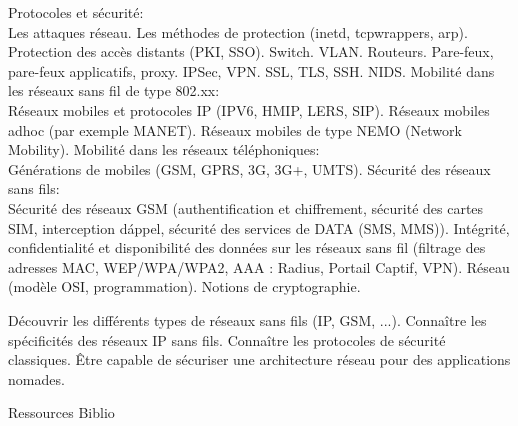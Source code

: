 \vfill

{
Protocoles et sécurité:\\
Les attaques réseau. Les méthodes de protection (inetd, tcpwrappers, arp).
Protection des accès distants (PKI, SSO). Switch. VLAN. Routeurs.
Pare-feux, pare-feux applicatifs, proxy.
IPSec, VPN.
SSL, TLS, SSH.
NIDS.
Mobilité dans les réseaux sans fil de type 802.xx:\\
Réseaux mobiles et protocoles IP (IPV6, HMIP, LERS, SIP).
Réseaux mobiles adhoc (par exemple MANET).
Réseaux mobiles de type NEMO (Network Mobility).
Mobilité dans les réseaux téléphoniques:\\
Générations de mobiles (GSM, GPRS, 3G, 3G+, UMTS).
Sécurité des réseaux sans fils:\\
Sécurité des réseaux GSM (authentification et chiffrement, sécurité des cartes SIM, interception d\'appel, sécurité des services de DATA (SMS, MMS)).
Intégrité, confidentialité et disponibilité des données sur les réseaux sans fil (filtrage des adresses MAC, WEP/WPA/WPA2, AAA : Radius, Portail Captif, VPN). 
}
{Réseau (modèle OSI, programmation). Notions de cryptographie.} 
{\begin{itemize}
\ObjItem Découvrir les différents types de réseaux sans fils (IP, GSM, ...).
\ObjItem Connaître les spécificités des réseaux IP sans fils.
\ObjItem Connaître les protocoles de sécurité classiques.
\ObjItem Être capable de sécuriser une architecture réseau pour des applications nomades.
\end{itemize} 
} 
{Ressources} 
{Biblio} 
 
\vfill

